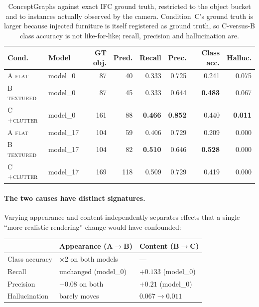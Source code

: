 \documentclass[11pt,a4paper]{article}
\begin{document}
\begin{table}[h]
\centering
\small
\begin{tabular}{@{}llrrrrrr@{}}
\toprule
\textbf{Cond.} & \textbf{Model} & \textbf{GT obj.} & \textbf{Pred.} &
\textbf{Recall} & \textbf{Prec.} & \textbf{Class acc.} & \textbf{Halluc.} \\
\midrule
A \textsc{flat}     & model\_0  &  87 &  40 & 0.333 & 0.725 & 0.241 & 0.075 \\
B \textsc{textured} & model\_0  &  87 &  45 & 0.333 & 0.644 & \textbf{0.483} & 0.067 \\
C \textsc{+clutter} & model\_0  & 161 &  88 & \textbf{0.466} & \textbf{0.852} & 0.440 & \textbf{0.011} \\
\midrule
A \textsc{flat}     & model\_17 & 104 &  59 & 0.406 & 0.729 & 0.209 & 0.000 \\
B \textsc{textured} & model\_17 & 104 &  82 & \textbf{0.510} & 0.646 & \textbf{0.528} & 0.000 \\
C \textsc{+clutter} & model\_17 & 169 & 118 & 0.509 & 0.729 & 0.419 & 0.000 \\
\bottomrule
\end{tabular}
\caption{ConceptGraphs against exact IFC ground truth, restricted to the object
bucket and to instances actually observed by the camera. Condition~C's ground
truth is larger because injected furniture is itself registered as ground truth,
so C-versus-B class accuracy is not like-for-like; recall, precision and
hallucination are.}
\label{tab:sg}
\end{table}

\paragraph{The two causes have distinct signatures.} Varying appearance and
content independently separates effects that a single ``more realistic
rendering'' change would have confounded:

\begin{center}
\small
\begin{tabular}{@{}lll@{}}
\toprule
& \textbf{Appearance (A$\to$B)} & \textbf{Content (B$\to$C)} \\
\midrule
Class accuracy & $\times$2 on both models & --- \\
Recall         & unchanged (model\_0)     & $+0.133$ (model\_0) \\
Precision      & $-0.08$ on both          & $+0.21$ (model\_0) \\
Hallucination  & barely moves             & $0.067 \to 0.011$ \\
\bottomrule
\end{tabular}
\end{center}
\end{document}
